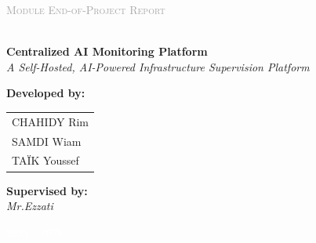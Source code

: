 \begin{titlepage}
\vspace{0.5cm}
\begin{center}
  \textcolor{DarkGray}{\normalsize\scshape Module End-of-Project Report}\\[10pt]
  \\[10pt]
  {\fontsize{20}{26}\bfseries\color{NavyBlue} Centralized AI Monitoring Platform}\\[5pt]
  {\normalsize\color{DarkGray}\itshape
    A Self-Hosted, AI-Powered Infrastructure Supervision Platform}\\[8pt]
\end{center}

\vspace{1.0cm}

\begin{minipage}[t]{0.48\textwidth}
  \textcolor{NavyBlue}{\bfseries Developed by:}\\[6pt]
  \begin{tabular}{@{}l}
    CHAHIDY Rim \\
    SAMDI Wiam  \\
    TAÏK Youssef
  \end{tabular}
\end{minipage}
\hfill
\begin{minipage}[t]{0.48\textwidth}
  \raggedleft
  \textcolor{NavyBlue}{\bfseries Supervised by:}\\[6pt]
  \textit{Mr.Ezzati}\\[14pt]
  
\end{minipage}

\vfill
\begin{center}
  \textcolor{white}{\small 2025 -- 2026}
\end{center}

\end{titlepage}
